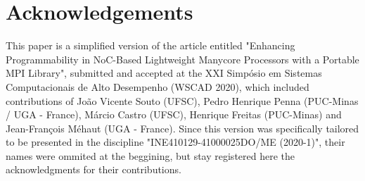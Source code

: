 \section*{Acknowledgements}

	This paper is a simplified version of the article entitled "Enhancing Programmability in
	NoC-Based Lightweight Manycore Processors with a Portable MPI Library", submitted and accepted
	at the XXI Simpósio em Sistemas Computacionais de Alto Desempenho (WSCAD 2020), which included
	contributions of João Vicente Souto (UFSC), Pedro Henrique Penna (PUC-Minas / UGA - France),
	Márcio Castro (UFSC), Henrique Freitas (PUC-Minas) and Jean-François Méhaut (UGA - France).
	Since this version was specifically tailored to be presented in the discipline
	"INE410129-41000025DO/ME (2020-1)", their names were ommited at the beggining, but stay registered
	here the acknowledgments for their contributions.
